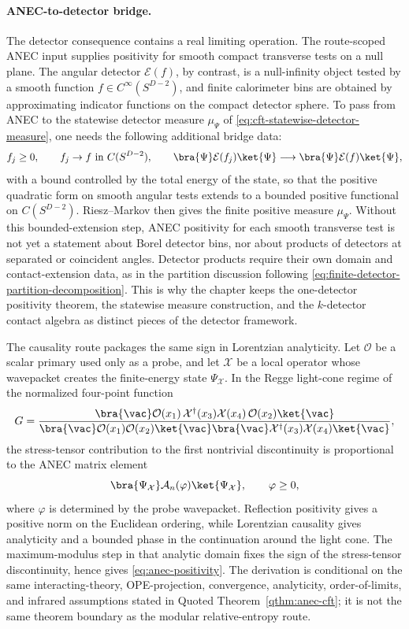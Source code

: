 \paragraph{ANEC-to-detector bridge.}
The detector consequence contains a real limiting operation.  The route-scoped
ANEC input supplies positivity for smooth compact transverse tests on a null
plane.  The angular detector \(\mathcal E(f)\), by contrast, is a
null-infinity object tested by a smooth function
\(f\in C^\infty(S^{D-2})\), and finite calorimeter bins are obtained by
approximating indicator functions on the compact detector sphere.  To pass
from ANEC to the statewise detector measure
\(\mu_\Psi\) of \eqref{eq:cft-statewise-detector-measure}, one needs the
following additional bridge data:
\[
  f_j\geq0,\qquad f_j\to f\ \text{in }C(S^{D-2}),
  \qquad
  \bra{\Psi}\mathcal E(f_j)\ket{\Psi}
  \longrightarrow
  \bra{\Psi}\mathcal E(f)\ket{\Psi},
\]
with a bound controlled by the total energy of the state, so that the positive
quadratic form on smooth angular tests extends to a bounded positive
functional on \(C(S^{D-2})\).  Riesz--Markov then gives the finite positive
measure \(\mu_\Psi\).  Without this bounded-extension step, ANEC positivity
for each smooth transverse test is not yet a statement about Borel detector
bins, nor about products of detectors at separated or coincident angles.
Detector products require their own domain and contact-extension data, as in
the partition discussion following
\eqref{eq:finite-detector-partition-decomposition}.  This is why the chapter
keeps the one-detector positivity theorem, the statewise measure
construction, and the \(k\)-detector contact algebra as distinct pieces of
the detector framework.

The causality route packages the same sign in Lorentzian analyticity.  Let
\(\mathcal O\) be a scalar primary used only as a probe, and let
\(\mathcal X\) be a local operator whose wavepacket creates the finite-energy
state \(\Psi_{\mathcal X}\).  In the Regge light-cone regime of the normalized
four-point function
\[
  G=
  \frac{\bra{\vac}\mathcal O(x_1)\,\mathcal X^\dagger(x_3)
    \mathcal X(x_4)\,\mathcal O(x_2)\ket{\vac}}
  {\bra{\vac}\mathcal O(x_1)\mathcal O(x_2)\ket{\vac}
   \bra{\vac}\mathcal X^\dagger(x_3)\mathcal X(x_4)\ket{\vac}},
\]
the stress-tensor contribution to the first nontrivial discontinuity is
proportional to the ANEC matrix element
\[
  \bra{\Psi_{\mathcal X}}\mathcal A_n(\varphi)\ket{\Psi_{\mathcal X}},
  \qquad
  \varphi\geq0,
\]
where \(\varphi\) is determined by the probe wavepacket.  Reflection
positivity gives a positive norm on the Euclidean ordering, while Lorentzian
causality gives analyticity and a bounded phase in the continuation around
the light cone.  The maximum-modulus step in that analytic domain fixes the
sign of the stress-tensor discontinuity, hence gives
\eqref{eq:anec-positivity}.  The derivation is conditional on the same
interacting-theory, OPE-projection, convergence, analyticity,
order-of-limits, and infrared assumptions stated in
Quoted Theorem~\ref{qthm:anec-cft}; it is not the same theorem boundary as the
modular relative-entropy route.

